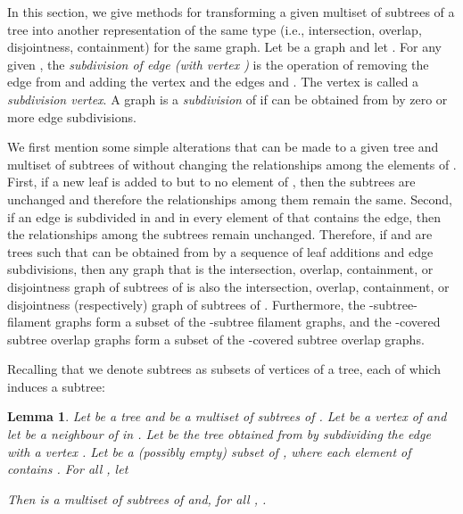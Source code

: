 \documentclass[
final
]{dmtcs-episciences}        \usepackage{graphics, amsthm, amsmath, amssymb, algorithm, algorithmic}
\newtheorem{lemma}{Lemma}
\begin{document}
In this section, we give methods for transforming a given multiset of subtrees of a tree into another representation of the same type 
(i.e., intersection, overlap, disjointness, containment) 
for the same graph.
Let  be a graph and let . For any given , 
the {\em subdivision of edge  (with vertex )} is the operation of removing the edge  from  and adding the vertex  and the edges  and . The vertex  is called a {\em subdivision vertex}. A graph  is a \emph{subdivision} of  if  can be obtained from  by zero or more edge subdivisions.  

We first mention some simple alterations that can be made to a given tree  and multiset  of subtrees of  without changing the relationships among the elements of .
First, if a new leaf is added to  but to no element of , then the subtrees are unchanged and therefore the relationships among them remain the same. Second, if an edge is subdivided in  and in every element of  that contains the edge, then the relationships among the subtrees remain unchanged.
Therefore, if  and  are trees such that  can be obtained from  by a sequence of leaf additions and edge subdivisions, then 
any graph that is the intersection, overlap, containment, or disjointness graph of subtrees of  is also the 
intersection, overlap, containment, or disjointness (respectively) graph of subtrees of .
Furthermore,
the -subtree-filament graphs form a subset of the -subtree filament graphs, and the -covered subtree overlap graphs form a subset of the -covered subtree overlap graphs.


Recalling that we denote subtrees as subsets of vertices of a tree, each of which induces a subtree:
\begin{lemma} \label{lem:subdiv}
Let  be a tree and  be a multiset of subtrees of . 
Let  be a vertex of  and let  be a neighbour of  in .
Let  be the tree obtained from  by 
subdividing the edge  with a vertex .
Let  be a (possibly empty) subset of , where each element of 
 contains .  
For all , let

Then
 is a multiset of subtrees of  and,
for all , .
\end{lemma}
\end{document}
